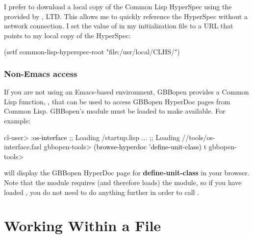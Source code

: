 \documentclass[10pt,twoside,english,pdftex]{article}
\begin{document}
I prefer to download a local copy of the Common Lisp HyperSpec using the
provided by , LTD.  This allows
me to quickly reference the HyperSpec without a network connection.  I set the
value of  in my 
initialization file to a URL that points to my local copy of the HyperSpec:
%
\W\supp
\begin{example}
  (setf common-lisp-hyperspec-root "file:/usr/local/CLHS/")
\end{example}

\subsubsection*{Non-Emacs access}

%
If you are not using an Emacs-based environment, GBBopen provides a Common
Lisp function, , that can be used to access
GBBopen HyperDoc pages from Common Lisp.  GBBopen's
 module must be loaded to make
 available.  For example:
%
\W\supp
\begin{example}
\textcolor{darkergray}{%
  cl-user> \textcolor{black}{:os-interface}
  ;; Loading /startup.lisp
     ...
  ;; Loading //tools/os-interface.fasl
  gbbopen-tools> \textcolor{black}{(browse-hyperdoc 'define-unit-class)}
  t
  gbbopen-tools>}
\end{example}
%
will display the GBBopen HyperDoc page for \textbf{define-unit-class} in your
browser.  Note that the  module requires (and
therefore loads) the  module, so if you have loaded
, you do not need to do anything further in order
to call .


\T\markright{}%
\T\pagestyle{plain}
\T\cleardoublepage
\W{}
\T\pagestyle{fancy}
\T\thispagestyle{fancybottom}
\T\renewcommand{\headrulewidth}{0pt}
\section{Working Within a File}
\label{sec:file}%
\end{document}
